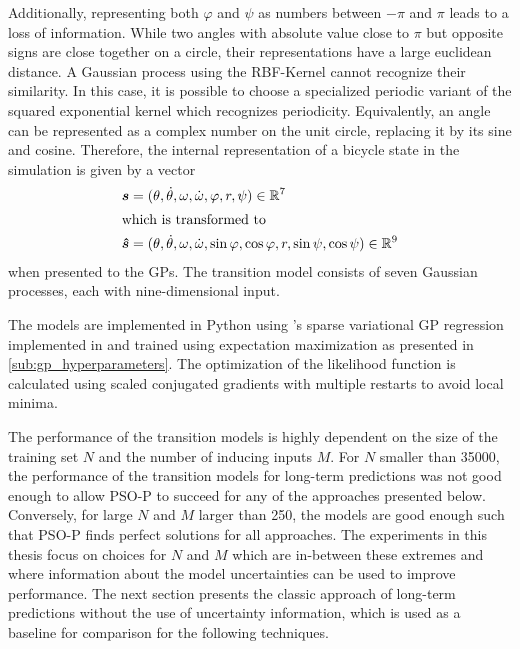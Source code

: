 Additionally, representing both $\varphi$ and $\psi$ as numbers between $-\pi$ and $\pi$ leads to a loss of information.
While two angles with absolute value close to $\pi$ but opposite signs are close together on a circle, their representations have a large euclidean distance.
A Gaussian process using the RBF-Kernel cannot recognize their similarity.
In this case, it is possible to choose a specialized periodic variant of the squared exponential kernel which recognizes periodicity.
Equivalently, an angle can be represented as a complex number on the unit circle, replacing it by its sine and cosine.
Therefore, the internal representation of a bicycle state in the simulation is given by a vector
\begin{align}
    \bm{s} &= (\theta, \dot{\theta}, \omega, \dot{\omega}, \varphi, r, \psi) \in \mathbb{R}^7 \\
    \intertext{which is transformed to}
    \bm{\hat{s}} &= (\theta, \dot{\theta}, \omega, \dot{\omega}, \sin\varphi, \cos\varphi, r, \sin\psi, \cos\psi) \in \mathbb{R}^9
\end{align}
when presented to the GPs.
The transition model consists of seven Gaussian processes, each with nine-dimensional input.

The models are implemented in Python using \citeauthor{titsias_variational_2009}'s sparse variational GP regression implemented in  \cite{gpy_gpy:_2012} and trained using expectation maximization as presented in \cref{sub:gp_hyperparameters}.
The optimization of the likelihood function is calculated using scaled conjugated gradients with multiple restarts to avoid local minima.

The performance of the transition models is highly dependent on the size of the training set $N$ and the number of inducing inputs $M$.
For $N$ smaller than 35000, the performance of the transition models for long-term predictions was not good enough to allow PSO-P to succeed for any of the approaches presented below.
Conversely, for large $N$ and $M$ larger than 250, the models are good enough such that PSO-P finds perfect solutions for all approaches.
The experiments in this thesis focus on choices for $N$ and $M$ which are in-between these extremes and where information about the model uncertainties can be used to improve performance.
The next section presents the classic approach of long-term predictions without the use of uncertainty information, which is used as a baseline for comparison for the following techniques.

